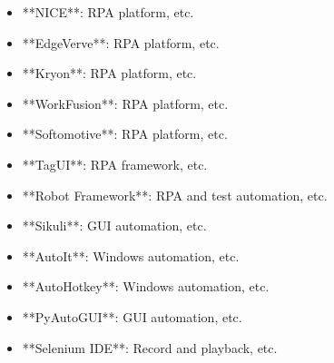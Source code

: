 \documentclass[11pt,a4paper]{article}
\begin{document}
\begin{itemize}
\item **NICE**: RPA platform, etc.
\end{itemize}

\begin{itemize}
\item **EdgeVerve**: RPA platform, etc.
\end{itemize}

\begin{itemize}
\item **Kryon**: RPA platform, etc.
\end{itemize}

\begin{itemize}
\item **WorkFusion**: RPA platform, etc.
\end{itemize}

\begin{itemize}
\item **Softomotive**: RPA platform, etc.
\end{itemize}

\begin{itemize}
\item **TagUI**: RPA framework, etc.
\end{itemize}

\begin{itemize}
\item **Robot Framework**: RPA and test automation, etc.
\end{itemize}

\begin{itemize}
\item **Sikuli**: GUI automation, etc.
\end{itemize}

\begin{itemize}
\item **AutoIt**: Windows automation, etc.
\end{itemize}

\begin{itemize}
\item **AutoHotkey**: Windows automation, etc.
\end{itemize}

\begin{itemize}
\item **PyAutoGUI**: GUI automation, etc.
\end{itemize}

\begin{itemize}
\item **Selenium IDE**: Record and playback, etc.
\end{itemize}
\end{document}
